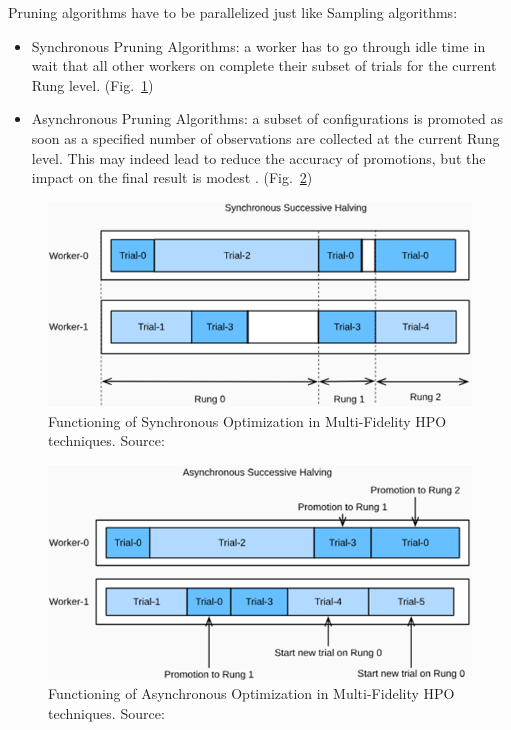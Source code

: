 % 
Pruning algorithms have to be parallelized just like Sampling algorithms:
\begin{itemize}[itemsep=0.1cm]
	\item Synchronous Pruning Algorithms: a worker has to go through idle time in wait that all other workers on complete their subset of trials for the current Rung level. (Fig.~\ref{fig:figure-2.4.2})
	\item Asynchronous Pruning Algorithms: a subset of configurations is promoted as soon as a specified number of observations are collected at the current Rung level. This may indeed lead to reduce the accuracy of promotions, but the impact on the final result is modest \cite{Tesi-1.6}. (Fig.~\ref{fig:figure-2.4.3})
\end{itemize}
\begin{figure}[t]
	\centering
	\includegraphics[width=12cm]{figures/figure-2.4.2.png}
	\caption[Functioning of Synchronous Optimization]{Functioning of Synchronous Optimization in Multi-Fidelity HPO techniques. Source:~\cite{Tesi-1.6}}
	\label{fig:figure-2.4.2}
\end{figure}
\begin{figure}[t]
	\centering
	\includegraphics[width=12cm]{figures/figure-2.4.3.png}
	\caption[Functioning of Asynchronous Optimization]{Functioning of Asynchronous Optimization in Multi-Fidelity HPO techniques. Source:~\cite{Tesi-1.6}}
	\label{fig:figure-2.4.3}
\end{figure}

